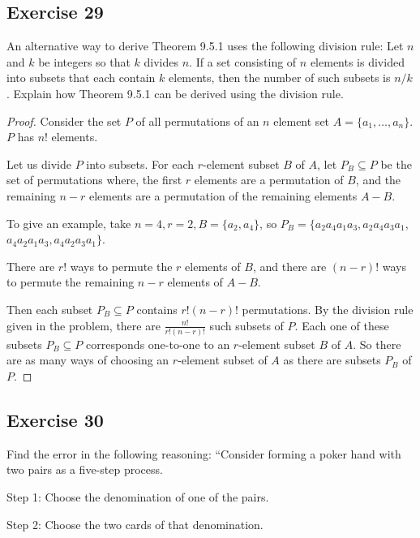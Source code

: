 \documentclass[14pt]{extarticle}
\newcommand{\dps}{\displaystyle}
\newcommand{\cy}{\color{cyan}}
\begin{document}
\subsection{Exercise 29}
An alternative way to derive Theorem 9.5.1 uses the following division rule: Let \(n\) and \(k\) be integers so that \(k\)
divides \(n\). If a set consisting of \(n\) elements is divided into subsets that each contain \(k\) elements, then
the number of such subsets is \(n/k\). Explain how Theorem 9.5.1 can be derived using the division rule.

\begin{proof}
     Consider the set \(P\) of all permutations of an \(n\) element set \(A = \{a_1, \ldots, a_n\}\). \(P\) has \(n!\) elements.

     Let us divide \(P\) into subsets. For each \(r\)-element subset \(B\) of \(A\), let \(P_B \subseteq P\) be the set of
     permutations where, the first \(r\) elements are a permutation of \(B\), and the remaining \(n-r\) elements are a permutation
     of the remaining elements \(A - B\).

     To give an example, take \(n = 4, r = 2, B = \{a_2, a_4\}\), so \(P_B = \{a_2a_4a_1a_3, a_2a_4a_3a_1\), \\ \(a_4a_2a_1a_3,
     a_4a_2a_3a_1\}\).

     There are \(r!\) ways to permute the \(r\) elements of \(B\), and there are \((n-r)!\) ways to permute the remaining
     \(n-r\) elements of \(A - B\).

     Then each subset \(P_B \subseteq P\) contains \(r!(n-r)!\) permutations. By the division rule given in the problem, there
     are \(\dps \frac{n!}{r!(n-r)!}\) such subsets of \(P\).
     Each one of these subsets \(P_B \subseteq P\) corresponds one-to-one to an \(r\)-element subset \(B\) of \(A\). So there are
     as many ways of choosing an \(r\)-element subset of \(A\) as there are subsets \(P_B\) of \(P\).
\end{proof}

\subsection{Exercise 30}
Find the error in the following reasoning: “Consider forming a poker hand with two pairs as a five-step process.

     {\cy Step 1:} Choose the denomination of one of the pairs.

     {\cy Step 2:} Choose the two cards of that denomination.
\end{document}
